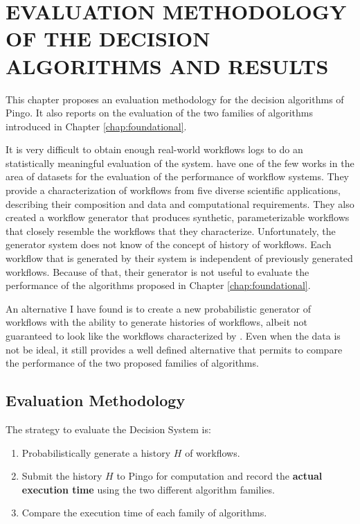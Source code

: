 \chapter{EVALUATION METHODOLOGY OF THE DECISION ALGORITHMS AND RESULTS}
\label{chap:evaluation}
This chapter proposes an evaluation methodology for the decision algorithms of Pingo.  It also reports on the evaluation of the two families of algorithms introduced in Chapter \ref{chap:foundational}.

It is very difficult to obtain enough real-world workflows logs to do an statistically meaningful evaluation of the system. \cite{bharathi2008characterization} have one of the few works in the area of datasets for the evaluation of the performance of workflow systems. They provide a characterization of workflows from five diverse scientific applications, describing their composition and data and computational requirements. They also created a workflow generator that produces synthetic, parameterizable workflows that closely resemble the workflows that they characterize. Unfortunately, the generator system does not know of the concept of history of workflows. Each workflow that is generated by their system is independent of previously generated workflows.  Because of that, their generator is not useful to evaluate the performance of the algorithms proposed in Chapter \ref{chap:foundational}.

An alternative I have found is to create a new probabilistic generator of workflows with the ability to generate histories of workflows, albeit not guaranteed to look like the workflows characterized by \cite{bharathi2008characterization}.  Even when the data is not be ideal, it still provides a well defined alternative that permits to compare the performance of the two proposed families of algorithms. 

\section{Evaluation Methodology}
The strategy to evaluate the Decision System is:
\begin{enumerate}
\item Probabilistically generate a history $H$ of workflows.
\item Submit the history $H$ to Pingo for computation and record the \textbf{actual execution time} using the two different algorithm families.
\item Compare the execution time of each family of algorithms.
\end{enumerate}
